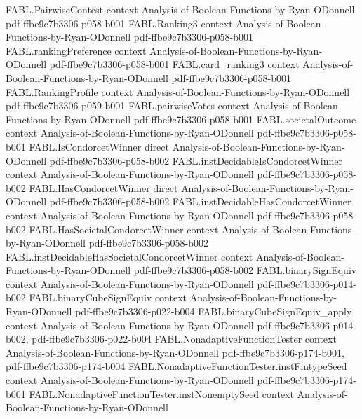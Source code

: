 \begin{theorem}
\proofstep
  {FABL.PairwiseContest}
  {context}
  {Analysis-of-Boolean-Functions-by-Ryan-ODonnell}
  {pdf-ffbe9c7b3306-p058-b001}
\proofstep
  {FABL.Ranking3}
  {context}
  {Analysis-of-Boolean-Functions-by-Ryan-ODonnell}
  {pdf-ffbe9c7b3306-p058-b001}
\proofstep
  {FABL.rankingPreference}
  {context}
  {Analysis-of-Boolean-Functions-by-Ryan-ODonnell}
  {pdf-ffbe9c7b3306-p058-b001}
\proofstep
  {FABL.card_ranking3}
  {context}
  {Analysis-of-Boolean-Functions-by-Ryan-ODonnell}
  {pdf-ffbe9c7b3306-p058-b001}
\proofstep
  {FABL.RankingProfile}
  {context}
  {Analysis-of-Boolean-Functions-by-Ryan-ODonnell}
  {pdf-ffbe9c7b3306-p059-b001}
\proofstep
  {FABL.pairwiseVotes}
  {context}
  {Analysis-of-Boolean-Functions-by-Ryan-ODonnell}
  {pdf-ffbe9c7b3306-p058-b001}
\proofstep
  {FABL.societalOutcome}
  {context}
  {Analysis-of-Boolean-Functions-by-Ryan-ODonnell}
  {pdf-ffbe9c7b3306-p058-b001}
\proofstep
  {FABL.IsCondorcetWinner}
  {direct}
  {Analysis-of-Boolean-Functions-by-Ryan-ODonnell}
  {pdf-ffbe9c7b3306-p058-b002}
\proofstep
  {FABL.instDecidableIsCondorcetWinner}
  {context}
  {Analysis-of-Boolean-Functions-by-Ryan-ODonnell}
  {pdf-ffbe9c7b3306-p058-b002}
\proofstep
  {FABL.HasCondorcetWinner}
  {direct}
  {Analysis-of-Boolean-Functions-by-Ryan-ODonnell}
  {pdf-ffbe9c7b3306-p058-b002}
\proofstep
  {FABL.instDecidableHasCondorcetWinner}
  {context}
  {Analysis-of-Boolean-Functions-by-Ryan-ODonnell}
  {pdf-ffbe9c7b3306-p058-b002}
\proofstep
  {FABL.HasSocietalCondorcetWinner}
  {context}
  {Analysis-of-Boolean-Functions-by-Ryan-ODonnell}
  {pdf-ffbe9c7b3306-p058-b002}
\proofstep
  {FABL.instDecidableHasSocietalCondorcetWinner}
  {context}
  {Analysis-of-Boolean-Functions-by-Ryan-ODonnell}
  {pdf-ffbe9c7b3306-p058-b002}
\proofstep
  {FABL.binarySignEquiv}
  {context}
  {Analysis-of-Boolean-Functions-by-Ryan-ODonnell}
  {pdf-ffbe9c7b3306-p014-b002}
\proofstep
  {FABL.binaryCubeSignEquiv}
  {context}
  {Analysis-of-Boolean-Functions-by-Ryan-ODonnell}
  {pdf-ffbe9c7b3306-p022-b004}
\proofstep
  {FABL.binaryCubeSignEquiv_apply}
  {context}
  {Analysis-of-Boolean-Functions-by-Ryan-ODonnell}
  {pdf-ffbe9c7b3306-p014-b002,
    pdf-ffbe9c7b3306-p022-b004}
\proofstep
  {FABL.NonadaptiveFunctionTester}
  {context}
  {Analysis-of-Boolean-Functions-by-Ryan-ODonnell}
  {pdf-ffbe9c7b3306-p174-b001,
    pdf-ffbe9c7b3306-p174-b004}
\proofstep
  {FABL.NonadaptiveFunctionTester.instFintypeSeed}
  {context}
  {Analysis-of-Boolean-Functions-by-Ryan-ODonnell}
  {pdf-ffbe9c7b3306-p174-b001}
\proofstep
  {FABL.NonadaptiveFunctionTester.instNonemptySeed}
  {context}
  {Analysis-of-Boolean-Functions-by-Ryan-ODonnell}

\end{theorem}
